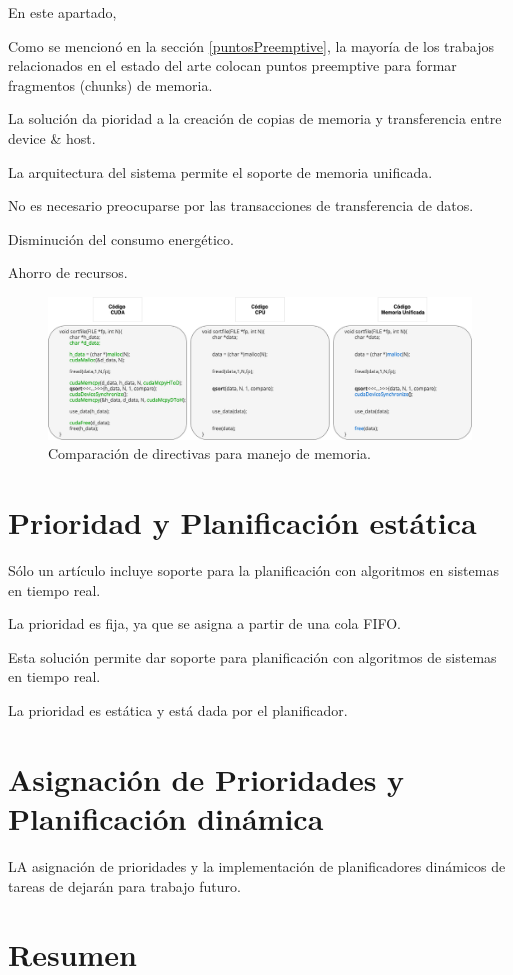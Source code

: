   En este apartado, 
  
  Como se mencionó en la sección \ref{puntosPreemptive}, la mayoría de los trabajos relacionados en el estado del arte colocan puntos preemptive para formar fragmentos (chunks) de memoria.
  
  La solución da pioridad a la creación de copias de memoria y transferencia entre device & host.
  
  La arquitectura del sistema permite el soporte de memoria unificada.
  
  No es necesario preocuparse por las transacciones de transferencia de datos.
  
  Disminución del consumo energético.
  
  Ahorro de recursos.
  
  \begin{figure}[ht]
      \centering
        \includegraphics[scale=.50]{img/direcMem}
        \caption{Comparación de directivas para manejo de memoria.}
        \label{fig:direcMem}
    \end{figure}
  
\section{Prioridad y Planificación estática}

Sólo un artículo incluye soporte para la planificación con algoritmos en sistemas en tiempo real.

La prioridad es fija, ya que se asigna a partir de una cola FIFO.

Esta solución permite dar soporte para planificación con algoritmos de sistemas en tiempo real.

La prioridad es estática y está dada por el planificador.
    
\section{Asignación de Prioridades y Planificación dinámica}
	LA asignación de prioridades y la implementación de planificadores dinámicos de tareas de dejarán para trabajo futuro.
\section{Resumen}




